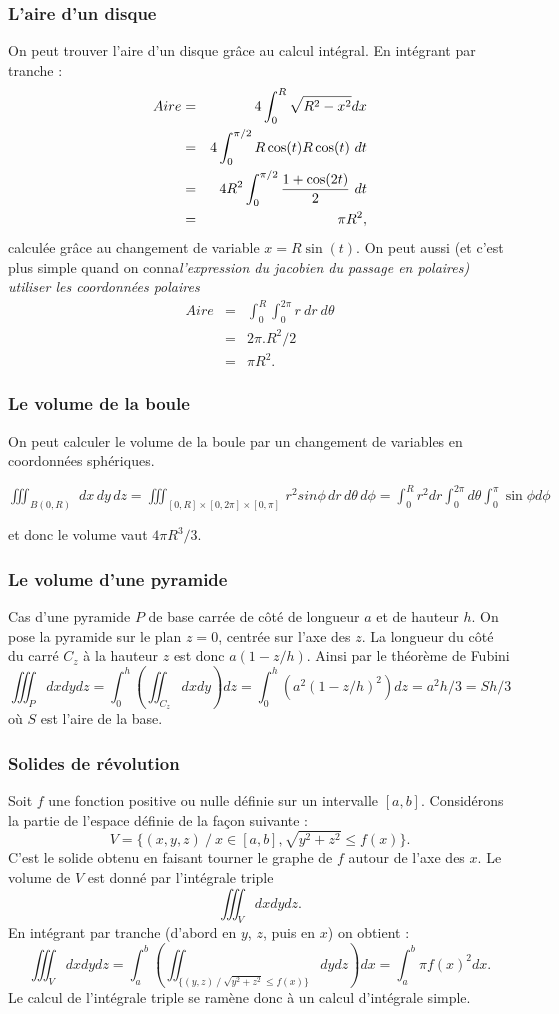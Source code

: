 \documentclass[12pt, class=report,crop=false]{standalone}
\begin{document}
{{{{{{{{{\subsubsection{L'aire d'un disque}
On peut trouver l'aire d'un disque gr\^ace au calcul intégral. En intégrant par tranche :
\begin{eqnarray*}
Aire&=&4\int_0^R\sqrt{R^2-x^2}dx\\
&=&4\int_0^{\pi/2}R\cos(t)R\cos(t)\ dt\\
&=&4R^2\int_0^{\pi/2}{{1+\cos(2t)}\over{2}} \ dt \\
&=& \pi R^2,
\end{eqnarray*}
calculée gr\^ace au changement de variable $x=R\sin(t)$. 
On peut aussi (et c'est plus simple quand on conna\^ \it l'expression du jacobien du passage en polaires) utiliser les coordonnées polaires
\begin{eqnarray*}
Aire&=&\int_0^R\int_0^{2\pi}r\ dr\ d\theta\\
&=&2\pi. R^2/2\\
&=& \pi R^2.
\end{eqnarray*}


\subsubsection{Le volume de la boule}
On peut calculer le volume de la boule par un changement de variables en coordonnées sphériques.

$\displaystyle \iiint_{B(0,R)}\,  \, dx\, dy\, dz= \iiint_{[0,R]\times [0,2\pi]\times [0,\pi]}\,  r^2 sin \phi\, dr\, d\theta\, d\phi=\int_0^Rr^2dr \int_0^{2\pi}d\theta \int_0^{\pi}\sin \phi d\phi$

et donc le volume vaut $4\pi R^3/3$.

\subsubsection{Le volume d'une pyramide}
Cas d'une pyramide $P$ de base carrée de c\^oté de longueur $a$ et de hauteur $h$. On pose la pyramide sur le plan $z=0$, centrée sur l'axe des $z$. La longueur du c\^oté du carré $C_z$ \`a la hauteur $z$ est donc $a(1-z/h)$. Ainsi par le théor\`eme de Fubini
$$ \iiint_Pdxdydz=\int_0^h( \iint_{C_z}dxdy)dz=\int_0^h( a^2(1-z/h)^2)dz=a^2h/3=Sh/3$$
o\`u $S$ est l'aire de la base.

\subsubsection{Solides de révolution}
Soit $f$ une fonction positive ou nulle définie sur un intervalle $[a,b]$. Considérons la partie de l'espace définie de la façon suivante :
$$
V=\{(x,y,z)\ /\ x\in[a,b], \sqrt{y^2+z^2}\leq f(x)\}.
$$
C'est le solide obtenu en faisant tourner le graphe de $f$ autour de l'axe des $x$.
Le volume de $V$ est donné par l'intégrale triple
$$
\iiint_Vdxdydz.
$$
En intégrant par tranche (d'abord en $y$, $z$, puis en $x$) on obtient :
$$
\iiint_Vdxdydz=\int_a^b\left(\iint_{\{(y,z)\ /\  \sqrt{y^2+z^2}\leq f(x)\}}dydz\right)dx=\int_a^b\pi f(x)^2dx.
$$
Le calcul de l'intégrale triple se ram\`ene donc \`a un calcul d'intégrale simple.

}}}}}}}}}
\end{document}
